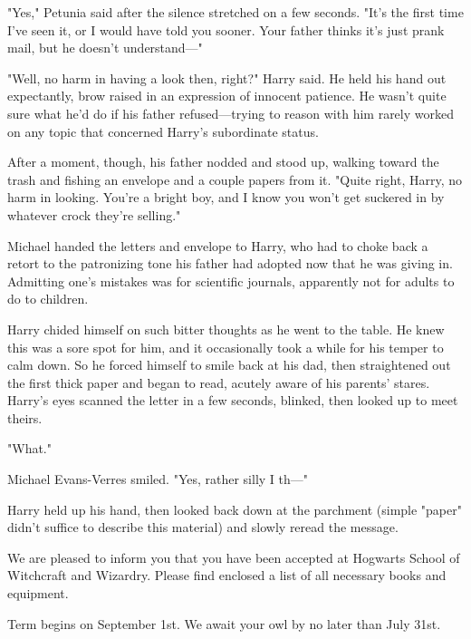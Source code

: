 "Yes," Petunia said after the silence stretched on a few
seconds. "It's the first time I've seen it, or I would have
told you sooner. Your father thinks it's just prank mail, but
he doesn't understand—"

"Well, no harm in having a look then, right?" Harry said.
He held his hand out expectantly, brow raised in an
expression of innocent patience. He wasn't quite sure what
he'd do if his father refused—trying to reason with him
rarely worked on any topic that concerned Harry's
subordinate status.

After a moment, though, his father nodded and stood up,
walking toward the trash and fishing an envelope and a
couple papers from it. "Quite right, Harry, no harm in
looking. You're a bright boy, and I know you won't get
suckered in by whatever crock they're selling."

Michael handed the letters and envelope to Harry, who
had to choke back a retort to the patronizing tone his
father had adopted now that he was giving in. Admitting
one's mistakes was for scientific journals, apparently{\el} not
for adults to do to children.

Harry chided himself on such bitter thoughts as he went
to the table. He knew this was a sore spot for him, and it
occasionally took a while for his temper to calm down. So
he forced himself to smile back at his dad, then
straightened out the first thick paper and began to
read, acutely aware of his parents' stares.
Harry's eyes scanned the letter in a few seconds, blinked,
then looked up to meet theirs.

"What."

Michael Evans-Verres smiled. "Yes, rather silly I th—"

Harry held up his hand, then looked back down at the
parchment (simple "paper" didn't suffice to describe this material)
and slowly reread the message.

\begin{writtenNote}

We are pleased to inform you that you have been
accepted at Hogwarts School of Witchcraft and Wizardry.
Please find enclosed a list of all necessary books and
equipment.

Term begins on September 1st. We await your owl by no
later than July 31st.

\end{writtenNote}

